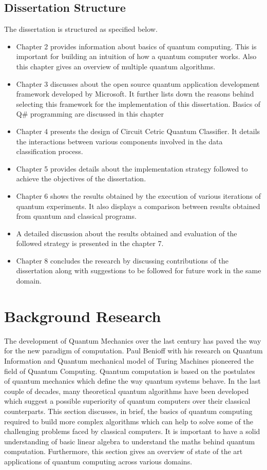 \documentclass[english,a4paper,11pt,oneside,onecolumn]{book}
\begin{document}
\section{Dissertation Structure}
\label{sec:dissStruc}
The dissertation is structured as specified below.

\begin{itemize}
  \item Chapter 2 provides information about basics of quantum computing. This is important for building an intuition of how a quantum computer works. Also this chapter gives an overview of multiple quantum algorithms.
  \item Chapter 3 discusses about the open source quantum application development framework developed by Microsoft. It further lists down the reasons behind selecting this framework for the implementation of this dissertation. Basics of Q\# programming are discussed in this chapter
  \item Chapter 4 presents the design of Circuit Cetric Quantum Classifier. It details the interactions between various components involved in the data classification process.
  \item Chapter 5 provides details about the implementation strategy followed to achieve the objectives of the dissertation.
  \item Chapter 6 shows the results obtained by the execution of various iterations of quantum experiments. It also displays a comparison between results obtained from quantum and classical programs.
  \item A detailed discussion about the results obtained and evaluation of the followed strategy is presented in the chapter 7.
  \item Chapter 8 concludes the research by discussing contributions of the dissertation along with suggestions to be followed for future work in the same domain.
\end{itemize}

\chapter{Background Research}
\label{sec:soa}

The development of Quantum Mechanics over the last century has paved the way for the new paradigm of computation. Paul Benioff with his research on Quantum Information and Quantum mechanical model of Turing Machines pioneered the field of Quantum Computing. Quantum computation is based on the postulates of quantum mechanics which define the way quantum systems behave. In the last couple of decades, many theoretical quantum algorithms have been developed which suggest a possible superiority of quantum computers over their classical counterparts. This section discusses, in brief, the basics of quantum computing required to build more complex algorithms which can help to solve some of the challenging problems faced by classical computers. It is important to have a solid understanding of basic linear algebra \cite{a3blue1brown_2016_vectors} to understand the maths behind quantum computation. Furthermore, this section gives an overview of state of the art applications of quantum computing across various domains.
\end{document}
